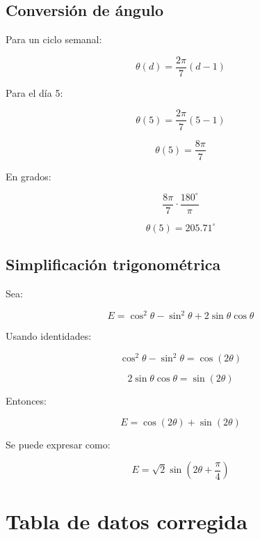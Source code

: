 \documentclass[12pt,a4paper]{article}
\begin{document}
\begin{center}
		\subsection{Conversión de ángulo}
		
		Para un ciclo semanal:
		
		\[
		\theta(d)=\frac{2\pi}{7}(d-1)
		\]
		
		Para el día 5:
		
		\[
		\theta(5)=\frac{2\pi}{7}(5-1)
		\]
		
		\[
		\theta(5)=\frac{8\pi}{7}
		\]
		
		En grados:
		
		\[
		\frac{8\pi}{7}\cdot\frac{180^\circ}{\pi}
		\]
		
		\[
		\theta(5)=205.71^\circ
		\]
		
		\subsection{Simplificación trigonométrica}
		
		Sea:
		
		\[
		E=\cos^2\theta-\sin^2\theta+2\sin\theta\cos\theta
		\]
		
		Usando identidades:
		
		\[
		\cos^2\theta-\sin^2\theta=\cos(2\theta)
		\]
		
		\[
		2\sin\theta\cos\theta=\sin(2\theta)
		\]
		
		Entonces:
		
		\[
		E=\cos(2\theta)+\sin(2\theta)
		\]
		
		Se puede expresar como:
		
		\[
		E=\sqrt{2}\sin\left(2\theta+\frac{\pi}{4}\right)
		\]
		
		\section{Tabla de datos corregida}
		

\end{center}
\end{document}
